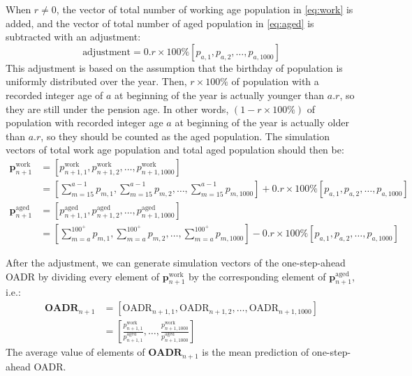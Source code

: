 \documentclass[11pt,a4paper,]{article}
\begin{document}
When \(r\neq0\), the vector of total number of working age population in \eqref{eq:work} is added, and the vector of total number of aged population in \eqref{eq:aged} is subtracted with an adjustment:
\begin{equation}
  \text{adjustment}=0.r\times100\%[p_{a,1},p_{a,2},\dots,p_{a,1000}]
\end{equation}
This adjustment is based on the assumption that the birthday of population is uniformly distributed over the year. Then, \(r\times100\%\) of population with a recorded integer age of \(a\) at beginning of the year is actually younger than \(a.r\), so they are still under the pension age. In other words, \((1-r\times100\%)\) of population with recorded integer age \(a\) at beginning of the year is actually older than \(a.r\), so they should be counted as the aged population. The simulation vectors of total work age population and total aged population should then be:
\begin{align*}
  \bm{p}^{\text{work}}_{n+1}
    & = \left[p^{\text{work}}_{n+1,1},p^{\text{work}}_{n+1,2},\dots,p^{\text{work}}_{n+1,1000}\right]\\
    & = \left[\sum_{m=15}^{a-1}p_{m,1},\sum_{m=15}^{a-1}p_{m,2},\dots,\sum_{m=15}^{a-1}p_{m,1000}\right]+0.r\times100\%\left[p_{a,1},p_{a,2},\dots,p_{a,1000}\right]   \\
  \bm{p}^{\text{aged}}_{n+1}
    & = \left[p^{\text{aged}}_{n+1,1},p^{\text{aged}}_{n+1,2},\dots,p^{\text{aged}}_{n+1,1000}\right]\\
    & = \left[\sum_{m=a}^{100^+}p_{m,1},\sum_{m=a}^{100^+}p_{m,2},\dots,\sum_{m=a}^{100^+}p_{m,1000}\right]-0.r\times100\%\left[p_{a,1},p_{a,2},\dots,p_{a,1000}\right]
\end{align*}

After the adjustment, we can generate simulation vectors of the one-step-ahead OADR by dividing every element of \(\bm{p}^{\text{work}}_{n+1}\) by the corresponding element of \(\bm{p}^{\text{aged}}_{n+1}\), i.e.:
\begin{align*}
  \bm{\text{OADR}}_{n+1} & = \left[\text{OADR}_{n+1,1},\text{OADR}_{n+1,2},\dots,\text{OADR}_{n+1,1000}\right]\\
                  & = \left[\frac{p^{\text{work}}_{n+1,1}}{p^{\text{aged}}_{n+1,1}},\dots,\frac{p^{\text{work}}_{n+1,1000}}{p^{\text{aged}}_{n+1,1000}}\right]
\end{align*}
The average value of elements of \(\bm{\text{OADR}}_{n+1}\) is the mean prediction of one-step-ahead OADR.
\end{document}
